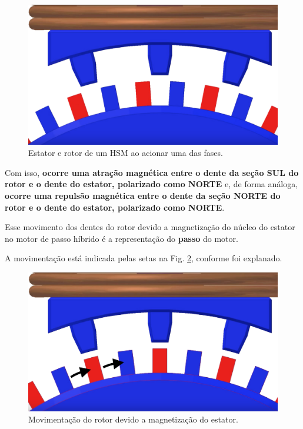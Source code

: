 	\begin{figure}[H]
		\centering 
		\includegraphics[scale=0.16]{images/hsm_operation/visaopasso2}
		\caption{Estator e rotor de um HSM ao acionar uma das fases.}
		\label{passo2}
	\end{figure}
	
	Com isso, \textbf{ocorre uma atração magnética entre o dente da seção SUL do rotor e o dente do estator, polarizado como NORTE} e, de forma análoga, \textbf{ocorre uma repulsão magnética entre o dente da seção NORTE do rotor e o dente do estator, polarizado como NORTE}.
	
	Esse movimento dos dentes do rotor devido a magnetização do núcleo do estator no motor de passo híbrido é a representação do \textbf{passo} do motor.
	
	A movimentação está indicada pelas setas na Fig. \ref{passo3}, conforme foi explanado.
	
	\begin{figure}[H]
		\centering 
		\includegraphics[scale=0.13]{images/hsm_operation/visaopasso3}
		\caption{Movimentação do rotor devido a magnetização do estator.}
		\label{passo3}
	\end{figure}  
	
